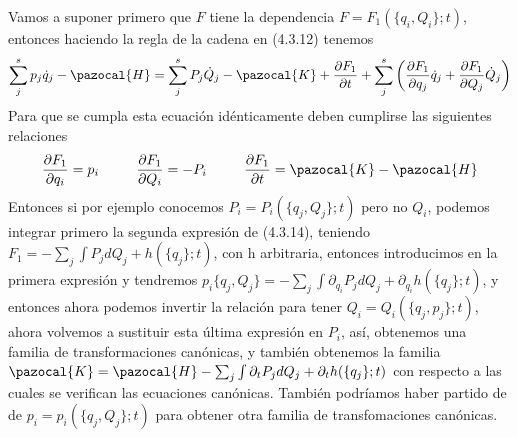 Vamos a suponer primero que $F$ tiene la dependencia $F = F_1(\{q_i,Q_i\};t)$, entonces haciendo la regla de la cadena en (4.3.12) tenemos
\begin{equation} \label{4.2.7}
    \sum_j^s p_j \dot{q}_j -\pazocal{H} = \sum_j^s P_j \dot{Q}_j -\pazocal{K} + \frac{\partial F_1}{\partial t} + \sum_j^s \left(\frac{\partial F_1}{\partial q_j}\dot{q}_j + \frac{\partial F_1}{\partial Q_j}\dot{Q}_j\right)
\end{equation} 
Para que se cumpla esta ecuación idénticamente deben cumplirse las siguientes relaciones 
\begin{equation} \label{4.2.7}
    \frac{\partial F_1}{\partial q_i} = p_i \ \ \ \ \ \ \ \ \frac{\partial F_1}{\partial Q_i} = -P_i \ \ \ \ \ \ \ \ \frac{\partial F_1}{\partial t} = \pazocal{K}-\pazocal{H}
\end{equation} 
Entonces si por ejemplo conocemos $P_i=P_i(\{q_j,Q_j\};t)$ pero no $Q_i$, podemos integrar primero la segunda expresión de (4.3.14), teniendo $F_1 = -\sum_j \int P_j dQ_j + h(\{q_j\};t)$, con h arbitraria, entonces introducimos en la primera expresión y tendremos $p_i \{q_j,Q_j\}= -\sum_j\int \partial_{q_i} P_j dQ_j + \partial_{q_i} h(\{q_j\};t)$, y entonces ahora podemos invertir la relación para tener $Q_i=Q_i(\{q_j,p_j\};t)$, ahora volvemos a sustituir esta última expresión en $P_i$, así, obtenemos una familia de transformaciones canónicas, y también obtenemos la familia $\pazocal{K} = \pazocal{H}-\sum_j\int \partial_t P_j dQ_j + \partial_t h(\{q_j\};t)$ con respecto a las cuales se verifican las ecuaciones canónicas. También podríamos haber partido de de $p_i=p_i(\{q_j,Q_j\};t)$ para obtener otra familia de transfomaciones canónicas.

